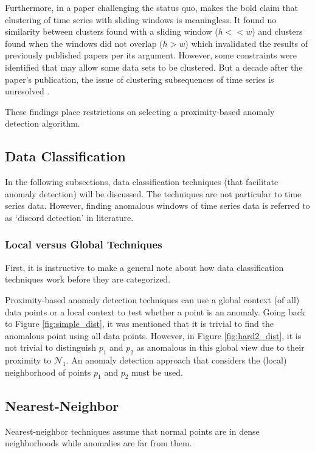 Furthermore, in a paper challenging the status quo, \cite{Keogh2004} makes the bold claim that clustering of time series with sliding windows is meaningless. It found no similarity between clusters found with a sliding window ($h<<w$) and clusters found when the windows did not overlap ($h>w$) which invalidated the results of previously published papers per its argument. However, some constraints were identified that may allow some data sets to be clustered. But a decade after the paper's publication, the issue of clustering subsequences of time series is unresolved \cite{Zolhavarieh2014}.

These findings place restrictions on selecting a proximity-based anomaly detection algorithm.


\subsection{Data Classification}

In the following subsections, data classification techniques (that facilitate anomaly detection) will be discussed. The techniques are not particular to time series data. However, finding anomalous windows of time series data is referred to as `discord detection' in literature.

\subsubsection{Local versus Global Techniques}

First, it is instructive to make a general note about how data classification techniques work before they are categorized.

Proximity-based anomaly detection techniques can use a global context (of all) data points or a local context to test whether a point is an anomaly. Going back to Figure \ref{fig:simple_dist}, it was mentioned that it is trivial to find the anomalous point using all data points. However, in Figure \ref{fig:hard2_dist}, it is not trivial to distinguish $p_1$ and $p_2$ as anomalous in this global view due to their proximity to $\mathcal{N}_1$. An anomaly detection approach that considers the (local) neighborhood of points $p_1$ and $p_2$ must be used.

\subsection{Nearest-Neighbor}

Nearest-neighbor techniques assume that normal points are in dense neighborhoods while anomalies are far from them.

